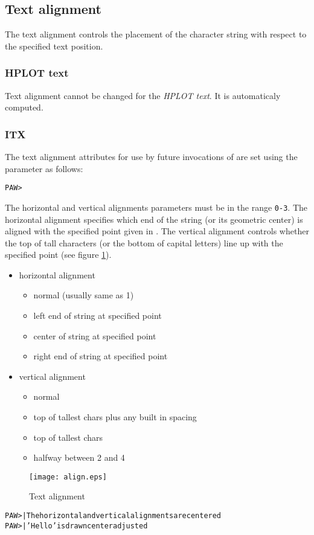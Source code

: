 \subsection*{Text alignment}
The text alignment controls the placement of the character string  with 
respect to the specified text position.
\subsubsection{HPLOT text}
Text alignment cannot be changed for the
{\em HPLOT text}. It is automaticaly computed.
\subsubsection{ITX}
The text alignment attributes for use by future invocations of 
are set using the  parameter as follows:
\begin{alltt}
PAW > 
\end{alltt}
The horizontal and 
vertical alignments parameters must be in the range \texttt{0-3}. The horizontal 
alignment specifies which end of the string (or its geometric center) is 
aligned with the specified point given in .
The vertical alignment controls whether the top of tall characters
(or the bottom of capital letters) line up with the specified point 
(see figure \ref{fig:ALIGN}).
\begin{itemize}
\item[ITXALH] horizontal alignment
\begin{itemize}
\item[0] normal (usually same as 1)
\item[1] left end of string at specified point
\item[2] center of string at specified point
\item[3] right end of string at specified point
\end{itemize}
\item[ITXALH] vertical alignment
\begin{itemize}
\item[0] normal
\item[1] top of tallest chars plus any built in spacing
\item[2] top of tallest chars
\item[3] halfway between 2 and 4 
\end{itemize}
\end{itemize}
\begin{figure}
\centering\texttt{[image: align.eps]}
\caption{Text alignment}
\label{fig:ALIGN}
\end{figure}
\begin{alltt}
PAW >    | The horizontal and vertical alignments are centered
PAW >  | 'Hello' is drawn center adjusted
\end{alltt}
